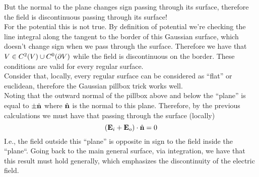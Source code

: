 \documentclass[../electromagnetism]{subfiles}
\begin{document}
But the normal to the plane changes sign passing through its surface, therefore the field is discontinuous passing through its surface!\\
For the potential this is not true. By definition of potential we're checking the line integral along the tangent to the border of this Gaussian surface, which doesn't change sign when we pass through the surface. Therefore we have that $V\in C^2(V)\cup C^0(\partial V)$ while the field is discontinuous on the border. These conditions are valid for every regular surface.\\
Consider that, locally, every regular surface can be considered as ``flat'' or euclidean, therefore the Gaussian pillbox trick works well.\\
Noting that the outward normal of the pillbox above and below the ``plane'' is equal to $\pm\hat{\mathbf{n}}$ where $\hat{\mathbf{n}}$ is the normal to this plane. Therefore, by the previous calculations we must have that passing through the surface (locally)
\begin{equation}
	\left( \mathbf{E}_i+\mathbf{E}_o \right)\cdot\hat{\mathbf{n}}=0
	\label{eq:efieldboundarycond}
\end{equation}
I.e., the field outside this ``plane'' is opposite in sign to the field inside the ``plane``. Going back to the main general surface, via integration, we have that this result must hold generally, which emphasizes the discontinuity of the electric field.
\end{document}
